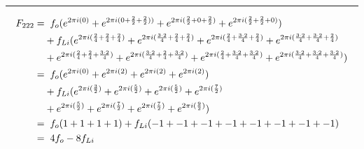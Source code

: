 \documentclass{article}
\begin{document}
\noindent\rule{12cm}{0.4pt}
\begin{align*}
	F_{222} =& \hspace{0.2cm}  f_{o}  (e^{2 \pi i (0)} 
	+ e^{2 \pi i (0 + \frac{2}{2} + \frac{2}{2}))} 
	+ e^{2 \pi i (\frac{2}{2} + 0 + \frac{2}{2})} 
	+ e^{2 \pi i (\frac{2}{2} + \frac{2}{2} + 0)})  \\
	&+ f_{Li} (e^{2 \pi i (\frac{2}{4} + \frac{2}{4} + \frac{2}{4})}  
	+ e^{2 \pi i (\frac{3 \cdot 2}{4} + \frac{2}{4} + \frac{2}{4})} 
	+ e^{2 \pi i (\frac{2}{4} + \frac{3 \cdot 2}{4} + \frac{2}{4})} 
	+ e^{2 \pi i (\frac{3 \cdot 2}{4} + \frac{3 \cdot 2}{4} + \frac{2}{4})} \\
	&+ e^{2 \pi i (\frac{2}{4} + \frac{2}{4} + \frac{3 \cdot 2}{4})}
	+ e^{2 \pi i (\frac{3 \cdot 2}{4} + \frac{2}{4} + \frac{3 \cdot 2}{4})} 
	+ e^{2 \pi i (\frac{2}{4} + \frac{3 \cdot 2}{4} + \frac{3 \cdot 2}{4})} 
	+ e^{2 \pi i (\frac{3 \cdot 2}{4} + \frac{3 \cdot 2}{4} + \frac{3 \cdot 2}{4})}) \\  
	=& \hspace{0.2cm}  f_{o}  (e^{2 \pi i (0)} 
	+ e^{2 \pi i (2)} 
	+ e^{2 \pi i (2)} 
	+ e^{2 \pi i (2)})  \\
	&+ f_{Li} (e^{2 \pi i (\frac{3}{2})}  
	+ e^{2 \pi i (\frac{5}{2})} 
	+ e^{2 \pi i (\frac{5}{2})} 
	+ e^{2 \pi i (\frac{7}{2})} \\
	&+ e^{2 \pi i (\frac{5}{2})}
	+ e^{2 \pi i (\frac{7}{2})} 
	+ e^{2 \pi i (\frac{7}{2})} 
	+ e^{2 \pi i (\frac{9}{2})}) \\
	=& \hspace{0.2cm}  f_{o}  (1  + 1 + 1 + 1) + f_{Li}(-1 + -1 + -1 + -1 + -1 + -1 + -1 + -1) \\
	=& \hspace{0.2cm} 4f_{o}   - 8f_{Li}
\end{align*}
\end{document}
